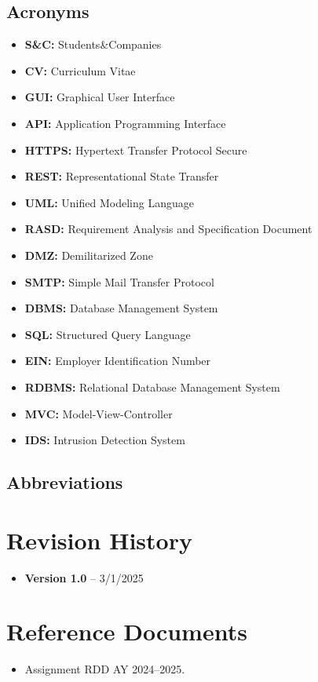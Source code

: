 \subsection{Acronyms}\label{subsec:acronyms}
\begin{itemize}
    \item \textbf{S\&C:} Students\&Companies
    \item \textbf{CV:} Curriculum Vitae
    \item \textbf{GUI:} Graphical User Interface
    \item \textbf{API:} Application Programming Interface
    \item \textbf{HTTPS:} Hypertext Transfer Protocol Secure
    \item \textbf{REST:} Representational State Transfer
    \item \textbf{UML:} Unified Modeling Language
    \item \textbf{RASD:} Requirement Analysis and Specification Document
    \item \textbf{DMZ:} Demilitarized Zone
    \item \textbf{SMTP:} Simple Mail Transfer Protocol
    \item \textbf{DBMS:} Database Management System
    \item \textbf{SQL:} Structured Query Language
    \item \textbf{EIN:} Employer Identification Number
    \item \textbf{RDBMS:} Relational Database Management System
    \item \textbf{MVC:} Model-View-Controller
    \item \textbf{IDS:} Intrusion Detection System
\end{itemize}

\subsection{Abbreviations}\label{subsec:abbreviations}

\section{Revision History}\label{sec:revision history}
\begin{itemize}
    \item \textbf{Version 1.0} – 3/1/2025
\end{itemize}
\section{Reference Documents}\label{sec:reference documents}
\begin{itemize}
    \item Assignment RDD AY 2024–2025.
\end{itemize}

